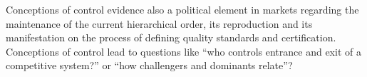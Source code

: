 \documentclass[a4paper, 12pt, openright, oneside, german, french, brazil, english]{abntex2}
\begin{document}
	
	Conceptions of control evidence also a political element in markets regarding the maintenance of the current hierarchical order, its reproduction and its manifestation on the process of defining quality standards and certification. Conceptions of control lead to questions like ``who controls entrance and exit of a competitive system?'' or ``how challengers and dominants relate''?
	
	
	
	
\end{document}
